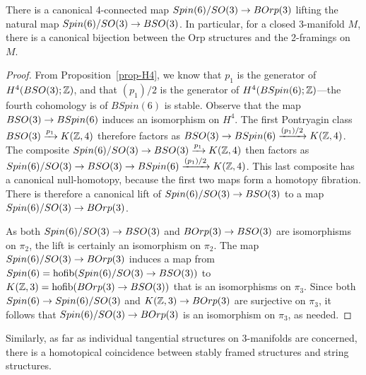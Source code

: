 \documentclass{amsart}
\begin{document}
\begin{proposition}
There is a canonical 4-connected map $Spin(6)/SO(3) \rightarrow BOrp(3)$ lifting the natural map $Spin(6)/SO(3) \rightarrow BSO(3)$.  In particular, for a closed 3-manifold $M$, there is a canonical bijection between the Orp structures and the 2-framings on $M$. 
\end{proposition}
\begin{proof}
From Proposition~\ref{prop-H4}, we know that $p_1$ is the generator of $H^4(BSO(3);\mathbb Z)$, and that $(p_1)/2$ is the generator of $H^4(BSpin(6);\mathbb Z)$---the fourth cohomology is of $BSpin(6)$ is stable.  Observe that the map $BSO(3) \rightarrow BSpin(6)$ induces an isomorphism on $H^4$.  The first Pontryagin class $BSO(3) \xrightarrow{p_1} K(\mathbb Z,4)$ therefore factors as $BSO(3) \rightarrow BSpin(6) \xrightarrow{(p_1)/2} K(\mathbb Z,4)$.  The composite $Spin(6)/SO(3) \rightarrow BSO(3) \xrightarrow{p_1} K(\mathbb Z,4)$ then factors as $Spin(6)/SO(3) \rightarrow BSO(3) \rightarrow BSpin(6) \xrightarrow{(p_1)/2} K(\mathbb Z,4)$.  This last composite has a canonical null-homotopy, because the first two maps form a homotopy fibration.  There is therefore a canonical lift of $Spin(6)/SO(3) \rightarrow BSO(3)$ to a map $Spin(6)/SO(3) \rightarrow BOrp(3)$.

As both $Spin(6)/SO(3) \rightarrow BSO(3)$ and $BOrp(3) \rightarrow BSO(3)$ are isomorphisms on $\pi_2$, the lift is certainly an isomorphism on $\pi_2$.  The map $Spin(6)/SO(3) \rightarrow BOrp(3)$ induces a map from $Spin(6) = \operatorname{hofib}(Spin(6)/SO(3) \rightarrow BSO(3))$ to $K(\mathbb Z,3) = \operatorname{hofib}(BOrp(3) \rightarrow BSO(3))$ that is an isomorphisms on $\pi_3$.  Since both $Spin(6) \rightarrow Spin(6)/SO(3)$ and $K(\mathbb Z,3) \rightarrow BOrp(3)$ are surjective on $\pi_3$, it follows that $Spin(6)/SO(3) \rightarrow BOrp(3)$ is an isomorphism on $\pi_3$, as needed.
\end{proof} %

Similarly, as far as individual tangential structures on 3-manifolds are concerned, there is a homotopical coincidence between stably framed structures and string structures.
\end{document}
